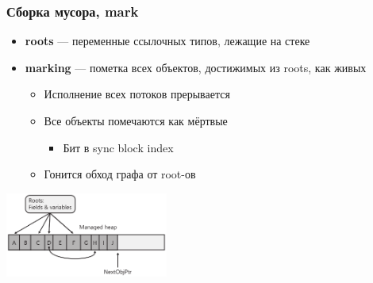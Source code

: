 \documentclass{../../slides-style}
\begin{document}
    \begin{frame}
        \frametitle{Сборка мусора, mark}
        \begin{itemize}
            \item \textbf{roots} --- переменные ссылочных типов, лежащие на стеке
            \item \textbf{marking} --- пометка всех объектов, достижимых из roots, как живых
            \begin{itemize}
                \item Исполнение всех потоков прерывается
                \item Все объекты помечаются как мёртвые
                \begin{itemize}
                    \item Бит в sync block index
                \end{itemize}
                \item Гонится обход графа от root-ов
            \end{itemize}
        \end{itemize}
        \begin{center}
            \includegraphics[width=0.4\textwidth]{heapBeforeCollection.png}
        \end{center}
    \end{frame}
\end{document}
